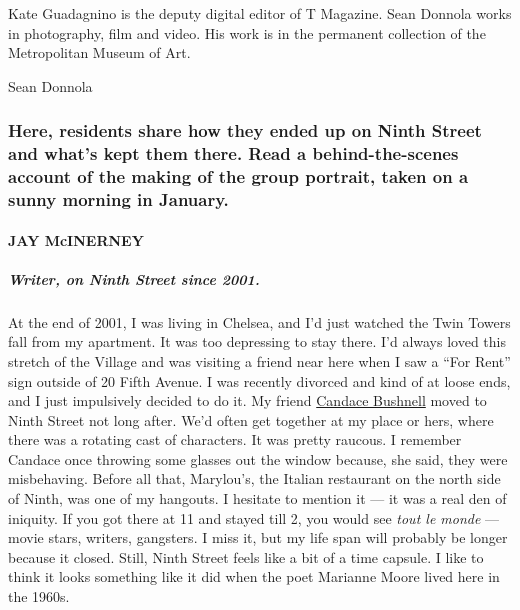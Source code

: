 Kate Guadagnino is the deputy digital editor of T Magazine. Sean Donnola
works in photography, film and video. His work is in the permanent
collection of the Metropolitan Museum of Art.

Sean Donnola

\hypertarget{here-residents-share-how-they-ended-up-on-ninth-street-and-whats-kept-them-there-read-a-behind-the-scenes-account-of-the-making-of-the-group-portrait-taken-on-a-sunny-morning-in-january}{%
\subsubsection{Here, residents share how they ended up on Ninth Street
and what's kept them there. Read a behind-the-scenes account of the
making of the group portrait, taken on a sunny morning in
January.}\label{here-residents-share-how-they-ended-up-on-ninth-street-and-whats-kept-them-there-read-a-behind-the-scenes-account-of-the-making-of-the-group-portrait-taken-on-a-sunny-morning-in-january}}

\hypertarget{jay-mcinerney}{%
\paragraph{JAY McINERNEY}\label{jay-mcinerney}}

\hypertarget{writer-on-ninth-street-since-2001}{%
\subparagraph{\texorpdfstring{\textbf{Writer, on Ninth Street since
2001.}}{Writer, on Ninth Street since 2001.}}\label{writer-on-ninth-street-since-2001}}

At the end of 2001, I was living in Chelsea, and I'd just watched the
Twin Towers fall from my apartment. It was too depressing to stay there.
I'd always loved this stretch of the Village and was visiting a friend
near here when I saw a ``For Rent'' sign outside of 20 Fifth Avenue. I
was recently divorced and kind of at loose ends, and I just impulsively
decided to do it. My friend
\href{https://www.nytimes.com/2019/08/02/nyregion/candace-bushnell.html}{Candace
Bushnell} moved to Ninth Street not long after. We'd often get together
at my place or hers, where there was a rotating cast of characters. It
was pretty raucous. I remember Candace once throwing some glasses out
the window because, she said, they were misbehaving. Before all that,
Marylou's, the Italian restaurant on the north side of Ninth, was one of
my hangouts. I hesitate to mention it --- it was a real den of iniquity.
If you got there at 11 and stayed till 2, you would see \emph{tout le
monde} --- movie stars, writers, gangsters. I miss it, but my life span
will probably be longer because it closed. Still, Ninth Street feels
like a bit of a time capsule. I like to think it looks something like it
did when the poet Marianne Moore lived here in the 1960s.

